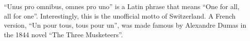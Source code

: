 ``Unus pro omnibus, omnes pro uno'' is a Latin phrase that means ``One for all, all for one''.
Interestingly, this is the unofficial motto of Switzerland.
A French version, ``Un pour tous, tous pour un'', was made famous by Alexandre Dumas in the 1844 novel ``The Three Musketeers''.